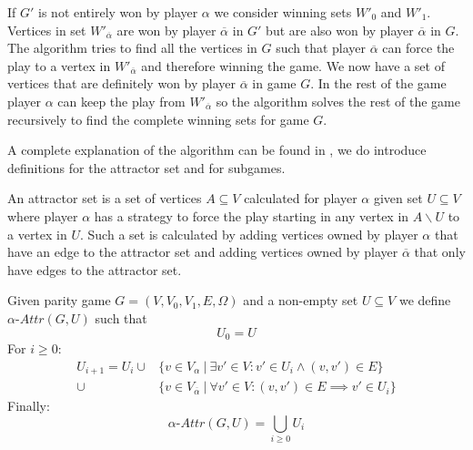 If $G'$ is not entirely won by player $\alpha$ we consider winning sets $W'_0$ and $W'_1$. Vertices in set $W'_{\overline{\alpha}}$ are won by player $\overline{\alpha}$ in $G'$ but are also won by player $\overline{\alpha}$ in $G$. The algorithm tries to find all the vertices in $G$ such that player $\overline{\alpha}$ can force the play to a vertex in $W'_{\overline{\alpha}}$ and therefore winning the game. We now have a set of vertices that are definitely won by player $\overline{\alpha}$ in game $G$. In the rest of the game player $\alpha$ can keep the play from $W'_{\overline{\alpha}}$ so the algorithm solves the rest of the game recursively to find the complete winning sets for game $G$.

A complete explanation of the algorithm can be found in \cite{ZIELONKA1998135}, we do introduce definitions for the attractor set and for subgames. 

An attractor set is a set of vertices $A \subseteq V$ calculated for player $\alpha$ given set $U \subseteq V$ where player $\alpha$ has a strategy to force the play starting in any vertex in $A \backslash U$ to a vertex in $U$. Such a set is calculated by adding vertices owned by player $\alpha$ that have an edge to the attractor set and adding vertices owned by player $\overline{\alpha}$ that only have edges to the attractor set.

\begin{definition}
	\label{def_attr}Given parity game $G = (V,V_0,V_1,E,\Omega)$ and a non-empty set $U \subseteq V$ we define $\alpha\textit{-Attr}(G,U)$ such that
	\[U_0 = U \]
	For $i \geq 0$:
	\begin{align*}
	U_{i+1} = U_i\cup
	&\{v \in V_\alpha\ |\ \exists v' \in V : v' \in U_i \wedge (v,v') \in E \}\\
	\cup &\{v \in V_{\overline{\alpha}}\ |\ \forall v' \in V :(v,v') \in E \implies v' \in U_i \}
	\end{align*}
	Finally:
	\[\alpha\textit{-Attr}(G,U) = \bigcup_{i \geq 0} U_i \]
\end{definition}


